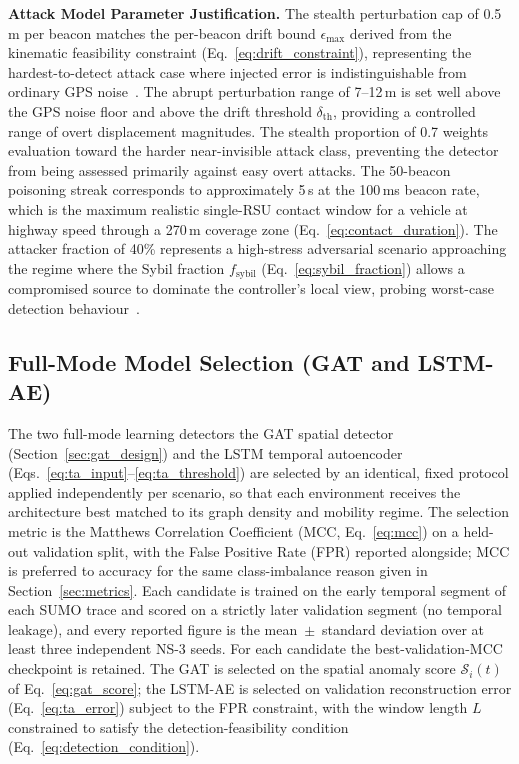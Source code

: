 \documentclass[12pt, a4paper]{report}
\begin{document}
\textbf{Attack Model Parameter Justification.}
The stealth perturbation cap of 0.5\,m per beacon matches the
per-beacon drift bound $\epsilon_{\max}$ derived from the kinematic
feasibility constraint (Eq.~\ref{eq:drift_constraint}),
representing the hardest-to-detect attack case where injected error
is indistinguishable from ordinary GPS noise~\cite{ghaleb2014}.
The abrupt perturbation range of 7--12\,m is set well above the
GPS noise floor and above the drift threshold $\delta_{\mathrm{th}}$,
providing a controlled range of overt displacement magnitudes.
The stealth proportion of 0.7 weights evaluation toward the harder
near-invisible attack class, preventing the detector from being
assessed primarily against easy overt attacks. The 50-beacon
poisoning streak corresponds to approximately 5\,s at the 100\,ms
beacon rate, which is the maximum realistic single-RSU contact
window for a vehicle at highway speed through a 270\,m coverage
zone (Eq.~\ref{eq:contact_duration}). The attacker fraction of
40\% represents a high-stress adversarial scenario approaching the
regime where the Sybil fraction $f_{\mathrm{sybil}}$
(Eq.~\ref{eq:sybil_fraction}) allows a compromised source to
dominate the controller's local view, probing worst-case detection
behaviour~\cite{raja2021}.

\subsection{Full-Mode Model Selection (GAT and LSTM-AE)}
\label{sec:model-selection}

The two full-mode learning detectors the GAT spatial detector
(Section~\ref{sec:gat_design}) and the LSTM temporal autoencoder
(Eqs.~\ref{eq:ta_input}--\ref{eq:ta_threshold}) are selected by an
identical, fixed protocol applied independently per scenario, so that each
environment receives the architecture best matched to its graph density and
mobility regime. The selection metric is the Matthews Correlation Coefficient
(MCC, Eq.~\ref{eq:mcc}) on a held-out validation split, with the False Positive
Rate (FPR) reported alongside; MCC is preferred to accuracy for
the same class-imbalance reason given in Section~\ref{sec:metrics}. Each
candidate is trained on the early temporal segment of each SUMO trace and scored
on a strictly later validation segment (no temporal leakage), and every reported
figure is the mean~$\pm$~standard deviation over at least three independent NS-3
seeds. For each candidate the best-validation-MCC checkpoint is retained. The GAT
is selected on the spatial anomaly score $\mathcal{S}_i(t)$ of
Eq.~\ref{eq:gat_score}; the LSTM-AE is selected on validation reconstruction
error (Eq.~\ref{eq:ta_error}) subject to the FPR constraint, with the window
length $L$ constrained to satisfy the detection-feasibility condition
(Eq.~\ref{eq:detection_condition}).
\end{document}
